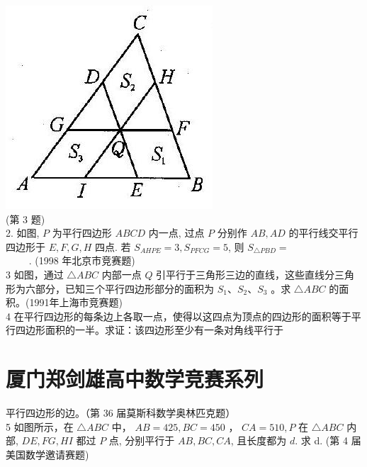 \documentclass[10pt]{article}
\begin{document}
\includegraphics[max width=\textwidth, center]{2024_10_30_2c8f45efd4a519b08e1ag-117(2)}\\
(第 3 题)\\
2. 如图, $P$ 为平行四边形 $A B C D$ 内一点, 过点 $P$ 分别作 $A B, A D$ 的平行线交平行四边形于 $E, F, G, H$ 四点. 若 $S_{A H P E}=3, S_{P F C G}=5$, 则 $S_{\triangle P B D}=$\\
$\qquad$ . (1998 年北京市竞赛题)\\
3 如图，通过 $\triangle A B C$ 内部一点 $Q$ 引平行于三角形三边的直线，这些直线分三角形为六部分，已知三个平行四边形部分的面积为 $S_{1} 、 S_{2} 、 S_{3}$ 。求 $\triangle A B C$ 的面积。(1991年上海市竞赛题)\\
4 在平行四边形的每条边上各取一点，使得以这四点为顶点的四边形的面积等于平行四边形面积的一半。求证：该四边形至少有一条对角线平行于

\section*{厦门郑剑雄高中数学竞赛系列}
平行四边形的边。（第 36 届莫斯科数学奥林匹克题）\\
5 如图所示，在 $\triangle A B C$ 中， $A B=425, B C=450$ ， $C A=510, P$ 在 $\triangle A B C$ 内部, $D E, F G, H I$ 都过 $P$ 点, 分别平行于 $A B, B C, C A$, 且长度都为 $d$. 求 d. (第 4 届美国数学邀请赛题)
\end{document}
